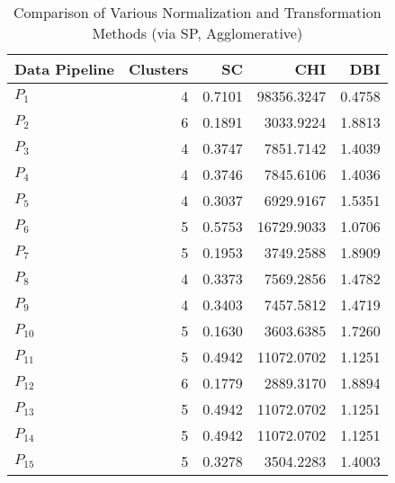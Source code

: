 \begin{table}[t]
\centering
\caption{Comparison of Various Normalization and Transformation Methods (via SP, Agglomerative)}
\label{tbl:Comparison_SP_Agglomerative_norm_tran}
\begin{tabular}{lrrrr}
\toprule
Data Pipeline &  Clusters &     SC &        CHI &    DBI \\
\midrule
      $P_{1}$ &         4 & 0.7101 & 98356.3247 & 0.4758 \\
      $P_{2}$ &         6 & 0.1891 &  3033.9224 & 1.8813 \\
      $P_{3}$ &         4 & 0.3747 &  7851.7142 & 1.4039 \\
      $P_{4}$ &         4 & 0.3746 &  7845.6106 & 1.4036 \\
      $P_{5}$ &         4 & 0.3037 &  6929.9167 & 1.5351 \\
      $P_{6}$ &         5 & 0.5753 & 16729.9033 & 1.0706 \\
      $P_{7}$ &         5 & 0.1953 &  3749.2588 & 1.8909 \\
      $P_{8}$ &         4 & 0.3373 &  7569.2856 & 1.4782 \\
      $P_{9}$ &         4 & 0.3403 &  7457.5812 & 1.4719 \\
     $P_{10}$ &         5 & 0.1630 &  3603.6385 & 1.7260 \\
     $P_{11}$ &         5 & 0.4942 & 11072.0702 & 1.1251 \\
     $P_{12}$ &         6 & 0.1779 &  2889.3170 & 1.8894 \\
     $P_{13}$ &         5 & 0.4942 & 11072.0702 & 1.1251 \\
     $P_{14}$ &         5 & 0.4942 & 11072.0702 & 1.1251 \\
     $P_{15}$ &         5 & 0.3278 &  3504.2283 & 1.4003 \\
\bottomrule
\end{tabular}
\end{table}
